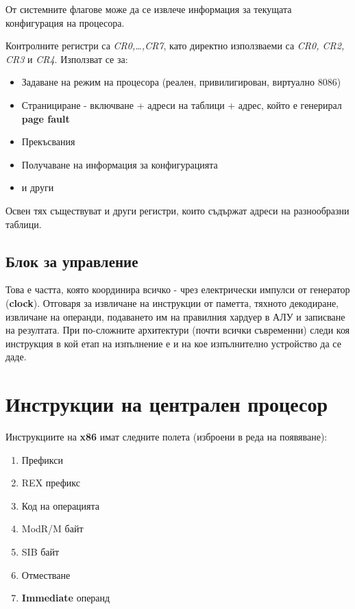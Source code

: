 \documentclass[fleqn,12pt]{article}
\begin{document}
От системните флагове може да се извлече информация за текущата конфигурация на процесора.

Контролните регистри са \textit{CR0,\dots,CR7}, като директно използваеми са \textit{CR0, CR2, CR3} и \textit{CR4}. Използват се за:
\begin{itemize}
    \item Задаване на режим на процесора (реален, привилигирован, виртуално 8086)
    \item Странициране - включване + адреси на таблици + адрес, който е генерирал \textbf{page fault}
    \item Прекъсвания
    \item Получаване на информация за конфигурацията
    \item и други
\end{itemize}

Освен тях съществуват и други регистри, които съдържат адреси на разнообразни таблици.

\subsection{Блок за управление}
Това е частта, която координира всичко - чрез електрически импулси от генератор (\textbf{clock}).
Отговаря за извличане на инструкции от паметта, тяхното декодиране, извличане на операнди, подаването им
на правилния хардуер в АЛУ и записване на резултата. При по-сложните архитектури (почти всички съвременни)
следи коя инструкция в кой етап на изпълнение е и на кое изпълнително устройство да се даде.

\section{Инструкции на централен процесор}
Инструкциите на \textbf{x86} имат следните полета (изброени в реда на появяване):
\begin{enumerate}
    \item Префикси
    \item REX префикс
    \item Код на операцията
    \item ModR/M байт
    \item SIB байт
    \item Отместване
    \item \textbf{Immediate} операнд
\end{enumerate}
\end{document}
